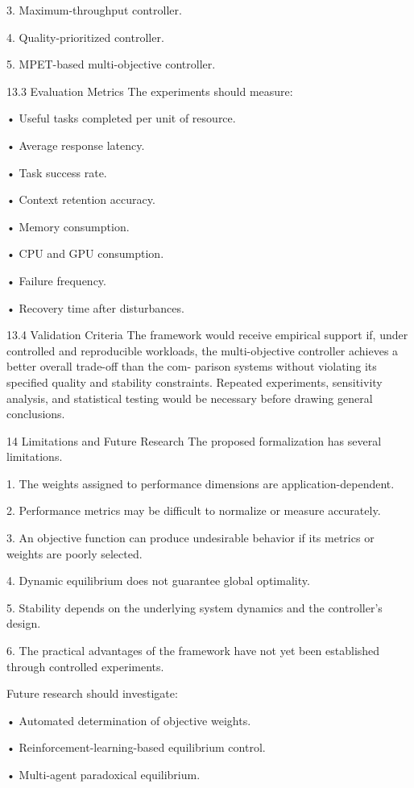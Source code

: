 \documentclass[10pt,a4paper]{article}
\begin{document}
\begin{ManuscriptText}
  3. Maximum-throughput controller.

  4. Quality-prioritized controller.

  5. MPET-based multi-objective controller.


13.3     Evaluation Metrics
The experiments should measure:

  • Useful tasks completed per unit of resource.

  • Average response latency.

  • Task success rate.

  • Context retention accuracy.

  • Memory consumption.

  • CPU and GPU consumption.

  • Failure frequency.

  • Recovery time after disturbances.


13.4     Validation Criteria
The framework would receive empirical support if, under controlled and reproducible
workloads, the multi-objective controller achieves a better overall trade-off than the com-
parison systems without violating its specified quality and stability constraints.
   Repeated experiments, sensitivity analysis, and statistical testing would be necessary
before drawing general conclusions.


14     Limitations and Future Research
The proposed formalization has several limitations.

  1. The weights assigned to performance dimensions are application-dependent.

  2. Performance metrics may be difficult to normalize or measure accurately.

  3. An objective function can produce undesirable behavior if its metrics or weights are
     poorly selected.

  4. Dynamic equilibrium does not guarantee global optimality.

  5. Stability depends on the underlying system dynamics and the controller’s design.

  6. The practical advantages of the framework have not yet been established through
     controlled experiments.

   Future research should investigate:

  • Automated determination of objective weights.

  • Reinforcement-learning-based equilibrium control.

  • Multi-agent paradoxical equilibrium.


\end{ManuscriptText}
\end{document}
